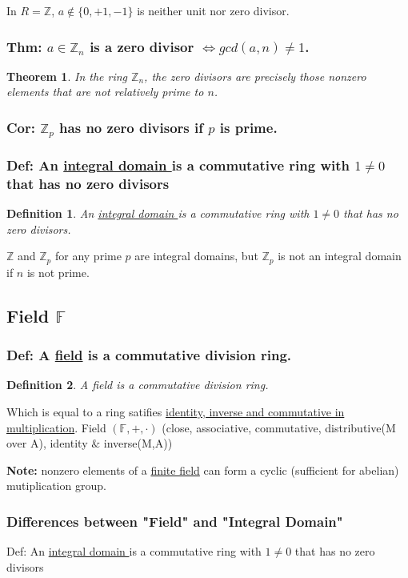 \documentclass[11pt,a4paper]{article}
\newtheorem{theorem}{Theorem}
\newtheorem{definition}{Definition}
\begin{document}
In $R=\mathbb{Z}$, $a\notin\{0,+1,-1\}$ is neither unit nor zero divisor.
\subsubsection{Thm: $a\in\mathbb{Z}_n$ is a zero divisor $\Leftrightarrow gcd(a,n)\neq 1$.}
\begin{theorem}
    In the ring $\mathbb{Z}_n$, the zero divisors are precisely those nonzero elements that are not relatively prime to $n$.
\end{theorem}
\subsubsection{Cor: $\mathbb{Z}_p$ has no zero divisors if $p$ is prime.}

\subsubsection{Def: An \underline{integral domain
} is a commutative ring with $1\neq 0$ that has no zero divisors}
\begin{definition}
    An \underline{integral domain
    } is a commutative ring with $1\neq 0$ that has no zero divisors.
\end{definition}
$\mathbb{Z}$ and $\mathbb{Z}_p$ for any prime $p$ are integral domains, but $\mathbb{Z}_p$ is not an integral domain if $n$ is not prime.

\subsection{Field $\mathbb{F}$}
\subsubsection{Def: A \underline{field} is a commutative division ring.}
\begin{definition}
    A field is a commutative division ring.
\end{definition}
Which is equal to a ring satifies \underline{identity, inverse and commutative in multiplication}.
Field $(\mathbb{F}, +, \cdot)$ (close, associative, commutative, distributive(M over A), identity $\&$ inverse(M,A))

\textbf{Note:} nonzero elements of a \underline{finite field} can form a cyclic (sufficient for abelian) mutiplication group.

\subsubsection{Differences between "Field" and "Integral Domain"}
Def: An \underline{integral domain
} is a commutative ring with $1\neq 0$ that has no zero divisors
\end{document}

